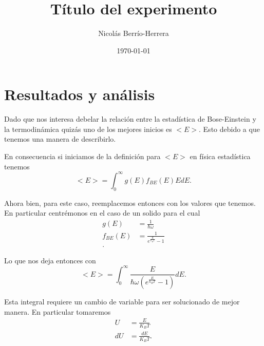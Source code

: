 \documentclass[a4paper, amsfonts, amssymb, amsmath, reprint, showkeys, nofootinbib, twoside]{revtex4-1}
\begin{document}
\title{Título del experimento}


\author{Nicolás Berrío-Herrera}

  


\date{\today} %

\maketitle

\section{Resultados y análisis}

Dado que nos interesa debelar la relación entre la estadística de Bose-Einstein y la termodinámica quizás uno de los mejores inicios es $<E>$. Esto debido a que tenemos una manera de describirlo. 

En consecuencia si iniciamos de la definición para $<E>$ en física estadística tenemos
\begin{equation}
  \label{eq:EBE}
  <E> = \int_0^\infty g(E)f_{BE}(E)EdE
.\end{equation}

Ahora bien, para este caso, reemplacemos entonces con los valores que tenemos. En particular centrémonos en el caso de un solido para el cual
\begin{align*}
  g(E) &= \frac{1}{\hbar \omega}\\
  f_{BE}(E) &= \frac{1}{e^{\frac{E}{k_BT}}-1}\\
.\end{align*}

Lo que nos deja entonces con
\begin{equation}
  \label{eq:EINT}
  <E> = \int_0^{\infty}\frac{E}{\hbar\omega \left( e^{\frac{E}{k_BT}}-1 \right) } dE
.\end{equation}

Esta integral requiere un cambio de variable para ser solucionado de mejor manera. En particular tomaremos
\begin{align*}
  U &= \frac{E}{K_BT} \\
  dU &= \frac{dE}{K_BT}
.\end{align*}
\end{document}
